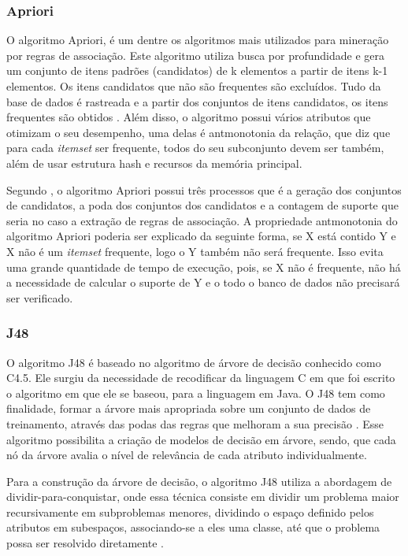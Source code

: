 \subsubsection{Apriori}

\par
O algoritmo Apriori, é um dentre os algoritmos mais utilizados para mineração por regras de associação. Este algoritmo utiliza busca por profundidade e gera um conjunto de itens padrões (candidatos) de k elementos a partir de itens k-1 elementos. Os itens candidatos que não são frequentes são excluídos. Tudo da base de dados é rastreada e a partir dos conjuntos de itens candidatos, os itens frequentes são obtidos \cite{Vasconcelos2004}. Além disso, o algoritmo possui vários atributos que otimizam o seu desempenho, uma delas é antmonotonia da relação, que diz que para cada \textit{itemset} ser frequente, todos do seu subconjunto devem ser também, além de usar estrutura hash e recursos da memória principal.

\par
Segundo , o algoritmo Apriori possui três processos que é a geração dos conjuntos de candidatos, a poda dos conjuntos dos candidatos e a contagem de suporte que seria no caso a extração de regras de associação. A propriedade antmonotonia do algoritmo Apriori poderia ser explicado da seguinte forma, se X está contido Y e X não é um \textit{itemset} frequente, logo o Y também não será frequente. Isso evita uma grande quantidade de tempo de execução, pois, se X não é frequente, não há a necessidade de calcular o suporte de Y e o todo o banco de dados não precisará ser verificado.


\subsubsection{J48}

\par
O algoritmo J48 é baseado no algoritmo de árvore de decisão conhecido como C4.5. Ele surgiu da necessidade de recodificar da linguagem C em que foi escrito o algoritmo em que ele se baseou, para a linguagem em Java. O J48 tem como finalidade, formar a árvore mais apropriada sobre um conjunto de dados de treinamento, através das podas das regras que melhoram a sua precisão \cite{Marques2014, Librelotto2014}. Esse algoritmo possibilita a criação de modelos de decisão em árvore, sendo, que cada nó da árvore avalia o nível de relevância de cada atributo individualmente.

\par
Para a construção da árvore de decisão, o algoritmo J48 utiliza a abordagem de dividir-para-conquistar, onde essa técnica consiste em dividir um problema maior recursivamente em subproblemas menores, dividindo o espaço definido pelos atributos em subespaços, associando-se a eles uma classe, até que o problema possa ser resolvido diretamente \cite{Librelotto2014}.


